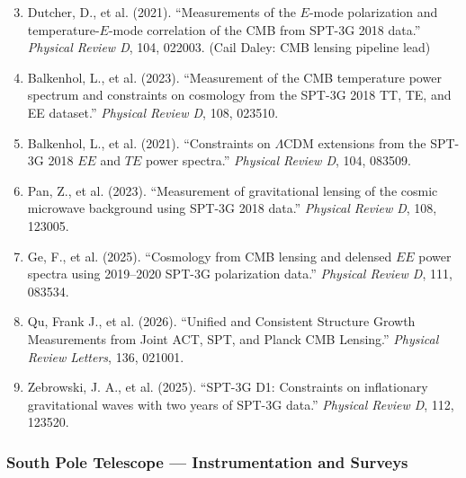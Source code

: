 \documentclass[11pt,a4paper]{article}
\begin{document}
\begin{enumerate}
\setcounter{enumi}{2}
\item Dutcher, D., et al. (2021). ``Measurements of the $E$-mode polarization and temperature-$E$-mode correlation of the CMB from SPT-3G 2018 data.'' \textit{Physical Review D}, 104, 022003. (Cail Daley: CMB lensing pipeline lead)

\item Balkenhol, L., et al. (2023). ``Measurement of the CMB temperature power spectrum and constraints on cosmology from the SPT-3G 2018 TT, TE, and EE dataset.'' \textit{Physical Review D}, 108, 023510.

\item Balkenhol, L., et al. (2021). ``Constraints on $\Lambda$CDM extensions from the SPT-3G 2018 $EE$ and $TE$ power spectra.'' \textit{Physical Review D}, 104, 083509.

\item Pan, Z., et al. (2023). ``Measurement of gravitational lensing of the cosmic microwave background using SPT-3G 2018 data.'' \textit{Physical Review D}, 108, 123005.

\item Ge, F., et al. (2025). ``Cosmology from CMB lensing and delensed $EE$ power spectra using 2019--2020 SPT-3G polarization data.'' \textit{Physical Review D}, 111, 083534.

\item Qu, Frank J., et al. (2026). ``Unified and Consistent Structure Growth Measurements from Joint ACT, SPT, and Planck CMB Lensing.'' \textit{Physical Review Letters}, 136, 021001.

\item Zebrowski, J. A., et al. (2025). ``SPT-3G D1: Constraints on inflationary gravitational waves with two years of SPT-3G data.'' \textit{Physical Review D}, 112, 123520.
\end{enumerate}

\subsubsection*{South Pole Telescope --- Instrumentation and Surveys}
\end{document}
